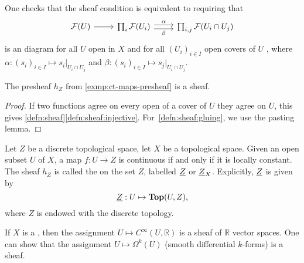 \begin{rmk}\label{rmk:sheafs-as-equalizers}
    One checks that the sheaf condition is equivalent to requiring that
\[\begin{tikzcd}
	{\mathcal{F}(U)} & {\prod_i\mathcal{F}(U_i)} & {\prod_{i,j}\mathcal{F}(U_i \cap U_j)}
	\arrow[from=1-1, to=1-2]
	\arrow["\alpha", shift left, from=1-2, to=1-3]
	\arrow["\beta"', shift right, from=1-2, to=1-3]
\end{tikzcd}\]
    is an  diagram for all $U$ open in $X$ and for all $(U_i)_{i \in I}$ open covers of $U$ , where $\alpha: (s_i)_{i \in I} \mapsto s_i|_{U_i \cap U_j}$ and $\beta: (s_i)_{i \in I} \mapsto s_j|_{U_i \cap U_j}$.
\end{rmk}

\begin{lem} \label{lem:ct-maps-sheaf}
    The presheaf $h_Z$ from \cref{exmp:ct-maps-presheaf} is a sheaf.
\end{lem}
\begin{proof}
    If two functions agree on every open of a cover of $U$ they agree on $U$, this gives \cref{defn:sheaf}\cref{defn:sheaf:injective}. For~\cref{defn:sheaf:gluing}, we use the pasting lemma.
\end{proof}

\begin{exmp}
    Let $Z$ be a discrete topological space, let $X$ be a topological space. Given an open subset $U$ of $X$, a map $f: U \to Z$ is continuous if and only if it is locally constant. The sheaf $h_Z$ is called the  on the set $Z$, labelled $\underline{Z}$ or $\underline{Z}_X$.
    Explicitly, \(\underline{Z}\) is given by
    \[ \constSheaf{Z} \colon U \mapsto \cont(U,Z)\text{,} \]
    where \(Z\) is endowed with the discrete topology.
\end{exmp}

\begin{exmp}
    If $X$ is a , then the assignment $U \mapsto C^\infty(U, \mathbb{R})$ is a sheaf of $\mathbb{R}$ vector spaces. One can show that the assignment $U \mapsto \Omega^k(U)$ (smooth differential $k$-forms) is a sheaf.
\end{exmp}

